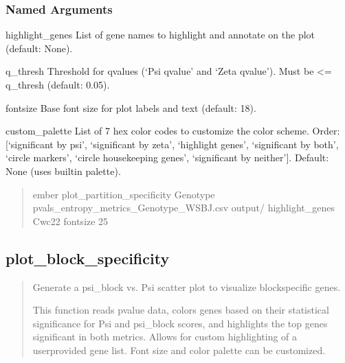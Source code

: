\documentclass[letterpaper,10pt,english]{sphinxmanual}
\begin{document}
\subsubsection{Named Arguments}
\label{\detokenize{cli:named-arguments_repeat1}}\begin{optionlist}{3cm}
\item [\sphinxhyphen{}\sphinxhyphen{}highlight\_genes]  
\sphinxAtStartPar
List of gene names to highlight and annotate on the plot (default: None).
\item [\sphinxhyphen{}\sphinxhyphen{}q\_thresh]  
\sphinxAtStartPar
Threshold for q\sphinxhyphen{}values (‘Psi q\sphinxhyphen{}value’ and ‘Zeta q\sphinxhyphen{}value’). Must be \textless{}= q\_thresh (default: 0.05).
\item [\sphinxhyphen{}\sphinxhyphen{}fontsize]  
\sphinxAtStartPar
Base font size for plot labels and text (default: 18).
\item [\sphinxhyphen{}\sphinxhyphen{}custom\_palette]  
\sphinxAtStartPar
List of 7 hex color codes to customize the color scheme. Order:
{[}‘significant by psi’, ‘significant by zeta’, ‘highlight genes’, ‘significant by both’, ‘circle markers’, ‘circle housekeeping genes’, ‘significant by neither’{]}. Default: None (uses built\sphinxhyphen{}in palette).
\end{optionlist}
\begin{quote}
\begin{description}
\sphinxAtStartPar
ember plot\_partition\_specificity Genotype pvals\_entropy\_metrics\_Genotype\_WSBJ.csv output/ \textendash{}highlight\_genes Cwc22 \textendash{}fontsize 25

\end{description}
\end{quote}


\subsection{plot\_block\_specificity}
\label{\detokenize{cli:plot_block_specificity}}\begin{quote}

\sphinxAtStartPar
Generate a psi\_block vs. Psi scatter plot to visualize block\sphinxhyphen{}specific genes.

\sphinxAtStartPar
This function reads p\sphinxhyphen{}value data, colors genes based on their statistical
significance for Psi and psi\_block scores, and highlights the top genes
significant in both metrics. Allows for custom highlighting of a user\sphinxhyphen{}provided
gene list. Font size and color palette can be customized.
\end{quote}
\end{document}
